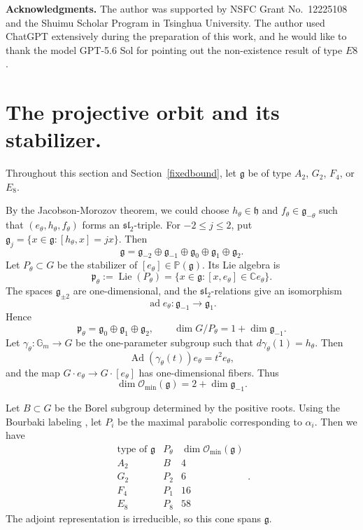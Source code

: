 \documentclass[10pt,a4paper]{amsart}
\DeclareMathOperator{\Ad}{Ad}
\DeclareMathOperator{\ad}{ad}
\newcommand{\C}{\mathbb C}
\newcommand{\Gm}{\mathbb G_m}
\newcommand{\Lieg}{\mathfrak{g}}
\newcommand{\h}{\mathfrak h}
\newcommand{\Omin}{\mathcal O_{\min}}
\begin{document}
\vspace{1em}
\textbf{Acknowledgments.}
The author was supported by NSFC Grant No.~12225108 and the Shuimu Scholar Program in Tsinghua University. The author used ChatGPT extensively during the preparation of this work, and he would like to thank the model GPT-5.6 Sol for pointing out the non-existence result of type $E8$.

\vspace{1em}
\section{The projective orbit and its stabilizer.}\label{projectiveorbit}

Throughout this section and Section~\ref{fixedbound}, let $\Lieg$ be of type $A_2$, $G_2$, $F_4$, or $E_8$.

By the Jacobson-Morozov theorem, we could choose $h_\theta\in\h$ and $f_\theta\in\Lieg_{-\theta}$ such that $(e_\theta,h_\theta,f_\theta)$ forms an $\mathfrak{sl}_2$-triple.  For $-2\le j\le2$, put
$
    \Lieg_j=\{x\in\Lieg:[h_\theta,x]=jx\}.
$
Then
\[
    \Lieg=\Lieg_{-2}\oplus\Lieg_{-1}\oplus\Lieg_0
    \oplus\Lieg_1\oplus\Lieg_2.
\]
Let $P_\theta\subset G$ be the stabilizer of $[e_\theta]\in\mathbb{P}(\Lieg)$. Its Lie algebra is
\[
    \mathfrak p_\theta:=\operatorname{Lie}(P_\theta)
    =\{x\in\Lieg:[x,e_\theta]\in\C e_\theta\}.
\]
The spaces $\Lieg_{\pm2}$ are one-dimensional, and the $\mathfrak{sl}_2$-relations give an isomorphism \[\ad e_\theta:\Lieg_{-1}\to\Lieg_1.\] Hence
\[
    \mathfrak p_\theta=\Lieg_0\oplus\Lieg_1\oplus\Lieg_2,
    \qquad
    \dim G/P_\theta=1+\dim\Lieg_{-1}.
\]
Let $\gamma_\theta:\Gm\to G$ be the one-parameter subgroup such that $d\gamma_\theta(1)=h_\theta$.
Then $$\Ad(\gamma_\theta(t))e_\theta=t^2e_\theta,$$ and the map $G\cdot e_\theta\to G\cdot[e_\theta]$ has one-dimensional fibers. Thus
\[
    \dim\Omin(\Lieg)=2+\dim\Lieg_{-1}.
\]

Let $B\subset G$ be the Borel subgroup determined by the positive roots. Using the Bourbaki labeling \cite[Planches I and VII--IX]{Bourbaki}, let $P_i$ be the maximal parabolic corresponding to $\alpha_i$. Then we have
\[
    \begin{array}{c|c|c}
    \text{type of }\Lieg&P_\theta&\dim\Omin(\Lieg)\\ \hline
    A_2&B&4\\
    G_2&P_2&6\\
    F_4&P_1&16\\
    E_8&P_8&58
    \end{array}.
\]
The adjoint representation is irreducible, so this cone spans $\Lieg$.
\end{document}
